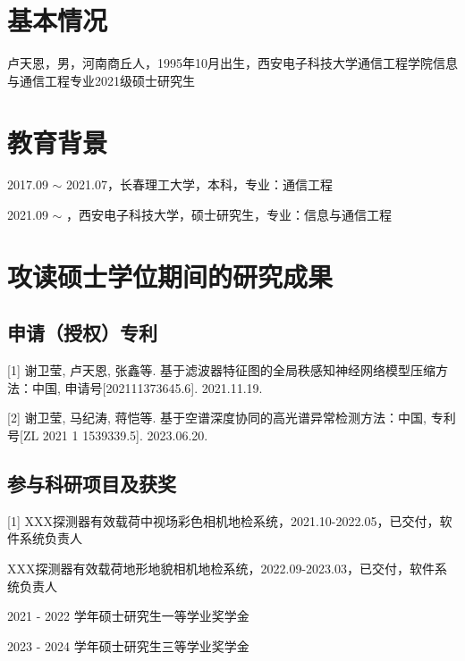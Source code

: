 \section{基本情况}
卢天恩，男，河南商丘人，1995年10月出生，西安电子科技大学通信工程学院信息与通信工程专业2021级硕士研究生

\section{教育背景}
2017.09 $\sim$ 2021.07，长春理工大学，本科，专业：通信工程
\par
2021.09 $\sim$ \quad\quad\hspace{15.0pt}，西安电子科技大学，硕士研究生，专业：信息与通信工程

\section{攻读硕士学位期间的研究成果}
\subsection{申请（授权）专利}
[1] 谢卫莹, 卢天恩, 张鑫等. 基于滤波器特征图的全局秩感知神经网络模型压缩方法：中国, 申请号[202111373645.6]. 2021.11.19.
\par
[2] 谢卫莹, 马纪涛, 蒋恺等. 基于空谱深度协同的高光谱异常检测方法：中国, 专利号[ZL 2021 1 1539339.5]. 2023.06.20.

\subsection{参与科研项目及获奖}
[1] XXX探测器有效载荷中视场彩色相机地检系统，2021.10-2022.05，已交付，软件系统负责人
\par
[2] XXX探测器有效载荷地形地貌相机地检系统，2022.09-2023.03，已交付，软件系统负责人
\par
[3] 2021 - 2022 学年硕士研究生一等学业奖学金
\par
[4] 2023 - 2024 学年硕士研究生三等学业奖学金
